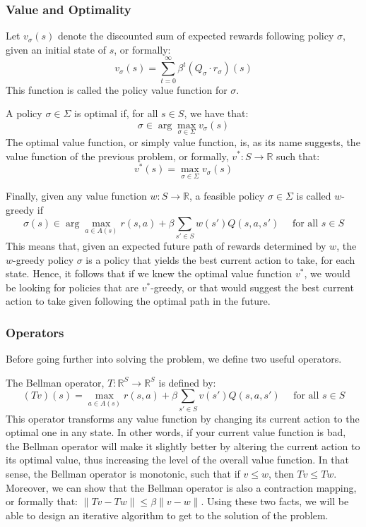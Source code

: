 \subsubsection{Value and Optimality}

Let $v_\sigma(s)$ denote the discounted sum of expected rewards following policy $\sigma$, given an initial state of $s$, or formally: $$v_\sigma(s) = \sum_{t=0}^{\infty} \beta^t (Q_\sigma\cdot r_\sigma)(s) $$ This function is called the policy value function for $\sigma$.

A policy $\sigma\in\Sigma$ is optimal if, for all $s\in S$, we have that: $$\sigma \in \arg\max_{\sigma\in\Sigma} v_\sigma(s) $$ The optimal value function, or simply value function, is, as its name suggests, the value function of the previous problem, or formally, $v^*:S\to\mathbb{R}$ such that: $$v^*(s) = \max_{\sigma\in\Sigma} v_\sigma(s)$$

Finally, given any value function $w:S\to\mathbb{R}$, a feasible policy $\sigma\in\Sigma$ is called $w$-greedy if $$\sigma(s)\in \arg\max_{a\in A(s)} r(s, a) + \beta \sum_{s'\in S} w(s') Q(s, a, s') \quad \text{ for all } s\in S $$
This means that, given an expected future path of rewards determined by $w$, the $w$-greedy policy $\sigma$ is a policy that yields the best current action to take, for each state. Hence, it follows that if we knew the optimal value function $v^*$, we would be looking for policies that are $v^*$-greedy, or that would suggest the best current action to take given following the optimal path in the future.

\subsubsection{Operators}

Before going further into solving the problem, we define two useful operators.

The Bellman operator, $T:\mathbb{R}^S\to\mathbb{R}^S$ is defined by: $$ (Tv)(s)  = \max_{a\in A(s)} r(s, a) + \beta\sum_{s'\in S} v(s')Q(s, a, s') \quad \text{ for all } s\in S $$ This operator transforms any value function by changing its current action to the optimal one in any state. In other words, if your current value function is bad, the Bellman operator will make it slightly better by altering the current action to its optimal value, thus increasing the level of the overall value function. In that sense, the Bellman operator is monotonic, such that if $v\leq w$, then $Tv\leq Tw$. Moreover, we can show that the Bellman operator is also a contraction mapping, or formally that: $\lVert Tv - Tw\rVert \leq \beta\lVert v - w\rVert$. Using these two facts, we will be able to design an iterative algorithm to get to the solution of the problem.

